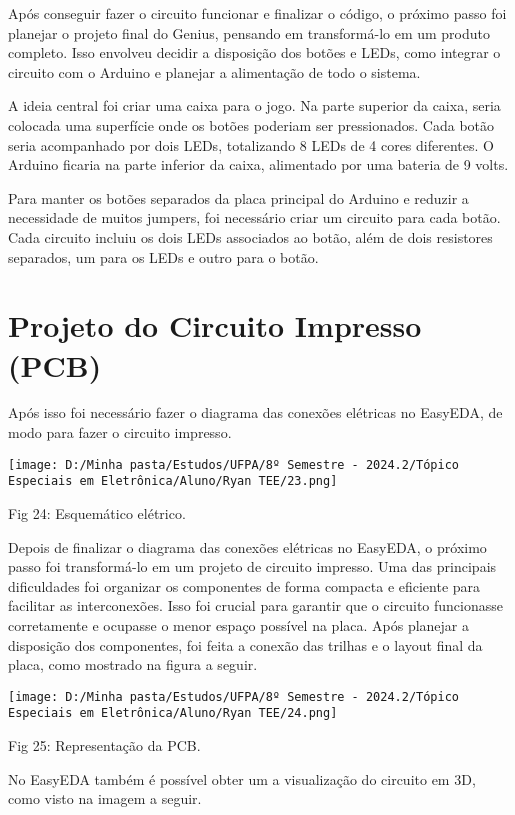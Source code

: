\documentclass[
]{book}
\begin{document}
Após conseguir fazer o circuito funcionar e finalizar o código, o próximo passo foi planejar o projeto final do Genius, pensando em transformá-lo em um produto completo. Isso envolveu decidir a disposição dos botões e LEDs, como integrar o circuito com o Arduino e planejar a alimentação de todo o sistema.

A ideia central foi criar uma caixa para o jogo. Na parte superior da caixa, seria colocada uma superfície onde os botões poderiam ser pressionados. Cada botão seria acompanhado por dois LEDs, totalizando 8 LEDs de 4 cores diferentes. O Arduino ficaria na parte inferior da caixa, alimentado por uma bateria de 9 volts.

Para manter os botões separados da placa principal do Arduino e reduzir a necessidade de muitos jumpers, foi necessário criar um circuito para cada botão. Cada circuito incluiu os dois LEDs associados ao botão, além de dois resistores separados, um para os LEDs e outro para o botão.

\section{Projeto do Circuito Impresso (PCB)}\label{projeto-do-circuito-impresso-pcb}

Após isso foi necessário fazer o diagrama das conexões elétricas no EasyEDA, de modo para fazer o circuito impresso.

\texttt{[image: D:/Minha pasta/Estudos/UFPA/8º Semestre - 2024.2/Tópico Especiais em Eletrônica/Aluno/Ryan TEE/23.png]}

Fig 24: Esquemático elétrico.

Depois de finalizar o diagrama das conexões elétricas no EasyEDA, o próximo passo foi transformá-lo em um projeto de circuito impresso. Uma das principais dificuldades foi organizar os componentes de forma compacta e eficiente para facilitar as interconexões. Isso foi crucial para garantir que o circuito funcionasse corretamente e ocupasse o menor espaço possível na placa.
Após planejar a disposição dos componentes, foi feita a conexão das trilhas e o layout final da placa, como mostrado na figura a seguir.

\texttt{[image: D:/Minha pasta/Estudos/UFPA/8º Semestre - 2024.2/Tópico Especiais em Eletrônica/Aluno/Ryan TEE/24.png]}

Fig 25: Representação da PCB.

No EasyEDA também é possível obter um a visualização do circuito em 3D, como visto na imagem a seguir.
\end{document}

